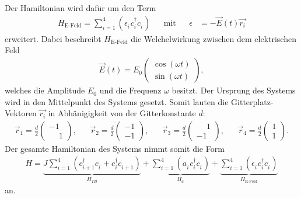 Der Hamiltonian wird dafür um den Term
\begin{align}
  H_\text{E-Feld}=\sum_{i=1}^4\left(\epsilon_i^{\phantom{\dag}} c_i^\dag c_i^{\phantom{\dag}}\right)& &\text{mit}& &\epsilon&=-\vec{E}(t) \vec{r_i}
\end{align}
erweitert. Dabei beschreibt $H_\text{E-Feld}$ die Welchelwirkung zwischen dem elektrischen Feld
\begin{align}
  \vec E(t)=E_0\begin{pmatrix}
\cos\left(\omega t\right)\\
\sin\left(\omega t\right)
 \end{pmatrix},
\end{align}
welches die Amplitude $E_0$ und
die Frequenz $\omega$ besitzt.
Der Ursprung des Systems wird
in den Mittelpunkt des Systems gesetzt.
Somit lauten die Gitterplatz-Vektoren
$\vec{r_i}$ in Abhänigigkeit von der
Gitterkonstante $d$:
\begin{align}
  \vec{r}_1=\frac{d}{2}\begin{pmatrix}-1  \\ \phantom{-}1 \end{pmatrix},& &
  \vec{r}_2=\frac{d}{2}\begin{pmatrix}-1  \\ -1 \end{pmatrix},& &
  \vec{r}_3=\frac{d}{2}\begin{pmatrix}\phantom{-}1  \\ -1 \end{pmatrix},& &
  \vec{r}_4=\frac{d}{2}\begin{pmatrix}1  \\ 1 \end{pmatrix}.
\end{align}
Der gesamte Hamiltonian des Systems nimmt somit die Form
\begin{align}
H=\underbrace{J\sum_{i=1}^4 \left(c_{i+1}^\dag c_i^{\phantom{\dag}} + c_{i}^\dag c_{i+1}^{\phantom{\dag}}\right)}_{H_{TB}}
+\underbrace{\sum_{i=1}^4 \left(a_i^{\phantom{\dag}} c_i^\dag c_i^{\phantom{\dag}}\right)}_{H_a}
+\underbrace{\sum_{i=1}^4 \left(\epsilon^{\phantom{\dag}}_i c_i^\dag c_i^{\phantom{\dag}}\right)}_{H_\text{E-Feld}}
\end{align}
an.


